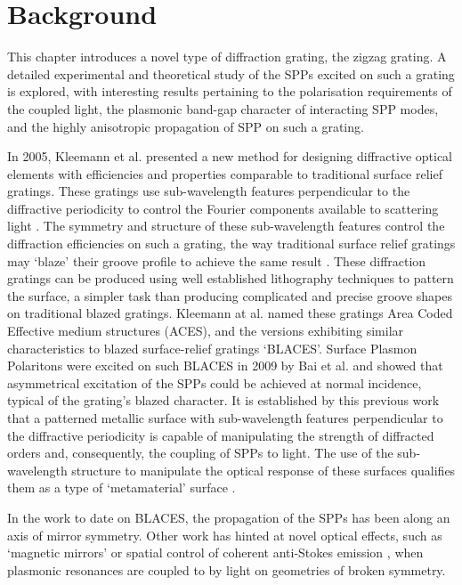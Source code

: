 \section{Background}
This chapter introduces a novel type of diffraction grating, the zigzag grating. A detailed experimental and theoretical study of the SPPs excited on such a grating is explored, with interesting results pertaining to the polarisation requirements of the coupled light, the plasmonic band-gap character of interacting SPP modes, and the highly anisotropic propagation of SPP on such a grating. 

In 2005, Kleemann et al. \cite{Kleemann2005} presented a new method for designing diffractive optical elements with efficiencies and properties comparable to traditional surface relief gratings. These gratings use sub-wavelength features perpendicular to the diffractive periodicity to control the Fourier components available to scattering light \cite{Ribot2007}. The symmetry and structure of these sub-wavelength features control the diffraction efficiencies on such a grating, the way traditional surface relief gratings may `blaze' their groove profile to achieve the same result \cite{Palmer2005}. These diffraction gratings can be produced using well established lithography techniques to pattern the surface, a simpler task than producing complicated and precise groove shapes on traditional blazed gratings. Kleemann at al. named these gratings Area Coded Effective medium structures (ACES), and the versions exhibiting similar characteristics to blazed surface-relief gratings `BLACES'. Surface Plasmon Polaritons were excited on such BLACES in 2009 by Bai et al.\cite{Bai2009} and showed that asymmetrical excitation of the SPPs could be achieved at normal incidence, typical of the grating's blazed character. It is established by this previous work that a patterned metallic surface with sub-wavelength features perpendicular to the diffractive periodicity is capable of manipulating the strength of diffracted orders and, consequently, the coupling of SPPs to light. The use of the sub-wavelength structure to manipulate the optical response of these surfaces qualifies them as a type of `metamaterial' surface \cite{Zheludev2010}.

In the work to date on BLACES, the propagation of the SPPs has been along an axis of mirror symmetry. Other work has hinted at novel optical effects, such as `magnetic mirrors' \cite{Chen2009,Schwanecke2007} or spatial control of coherent anti-Stokes emission \cite{Kim2008}, when plasmonic resonances are coupled to by light on geometries of broken symmetry. 


